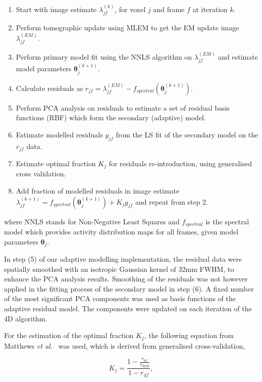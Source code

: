 \begin{enumerate}
  \item Start with image estimate $\lambda_{jf}^{(k)}$, for voxel $j$ and frame $f$ at iteration $k$. 
  \item Perform tomographic update using MLEM to get the EM update image $\lambda_{jf}^{(EM)}$.
  \item Perform primary model fit using the NNLS algorithm on $\lambda_{jf}^{(EM)}$ and estimate model parameters $\bm{\theta}_{j}^{(k+1)}$.
  \item Calculate residuals as $ r_{jf} = \lambda_{jf}^{(EM)} - f_{spectral}(\bm{\theta}_{j}^{(k+1)}) $.
  \item Perform PCA analysis on residuals to estimate a set of residual basis functions (RBF) which form the secondary (adaptive) model. 
  \item Estimate modelled residuals $g_{jf}$ from the LS fit of the secondary model on the $r_{jf}$ data. 
  \item Estimate optimal fraction $K_{j}$ for residuals re-introduction, using generalised cross validation.
  \item Add fraction of modelled residuals in image estimate $\lambda_{jf}^{(k+1)} = f_{spectral}(\bm{\theta}_{j}^{(k+1)}) + K_{j} g_{jf} $ and repeat from step 2.
\end{enumerate}

where NNLS stands for Non-Negative Least Squares and $f_{spectral}$ is the spectral model which provides activity distribution maps for all frames, given model parameters $\bm{\theta}_{j}$. 
        
In step (5) of our adaptive modelling implementation, the residual data were spatially smoothed with an isotropic Gaussian kernel of 32mm FWHM, to enhance the PCA analysis results. Smoothing of the residuals was not however applied in the fitting process of the secondary model in step (6). A fixed number of the most significant PCA components was used as basis functions of the adaptive residual model. The components were updated on each iteration of the 4D algorithm.

For the estimation of the optimal fraction $K_{j}$, the following equation from Matthews \textit{et al.}~\cite{Matthews2012} was used, which is derived from generalised cross-validation,

\begin{equation}
K_{j} = \frac{1-\frac{r_{df}}{r_{RSS}}}{1-r_{df}} , 
\end{equation}

